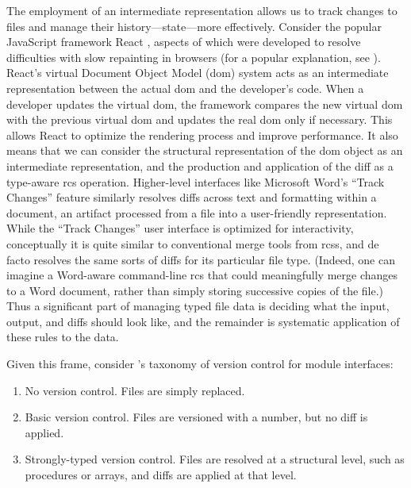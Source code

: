 \documentclass[twoside]{article}
\begin{document}
\noindent
The employment of an intermediate representation allows us to track changes to files and manage their history—state—more effectively.  Consider the popular JavaScript framework React \citep{React}, aspects of which were developed to resolve difficulties with slow repainting in browsers (for a popular explanation, see \citet{Arora2017}).  React's virtual Document Object Model ({\sc dom}) system acts as an intermediate representation between the actual {\sc dom} and the developer's code.  When a developer updates the virtual {\sc dom}, the framework compares the new virtual {\sc dom} with the previous virtual {\sc dom} and updates the real {\sc dom} only if necessary.  This allows React to optimize the rendering process and improve performance.  It also means that we can consider the structural representation of the {\sc dom} object as an intermediate representation, and the production and application of the diff as a type-aware {\sc rcs} operation.
Higher-level interfaces like Microsoft Word's “Track Changes” feature \citep{MS2024} similarly resolves diffs across text and formatting within a document, an artifact processed from a file into a user-friendly representation.  While the “Track Changes” user interface is optimized for interactivity, conceptually it is quite similar to conventional merge tools from {\sc rcs}s, and de facto resolves the same sorts of diffs for its particular file type.  (Indeed, one can imagine a Word-aware command-line {\sc rcs} that could meaningfully merge changes to a Word document, rather than simply storing successive copies of the file.)
Thus a significant part of managing typed file data is deciding what the input, output, and diffs should look like, and the remainder is systematic application of these rules to the data.

Given this frame, consider \citeauthor{Perry1987}'s taxonomy of version control for module interfaces:

\begin{enumerate}
  \item  No version control.  Files are simply replaced.
  \item  Basic version control.  Files are versioned with a number, but no diff is applied.
  \item  Strongly-typed version control.  Files are resolved at a structural level, such as procedures or arrays, and diffs are applied at that level.
\end{enumerate}
\end{document}
